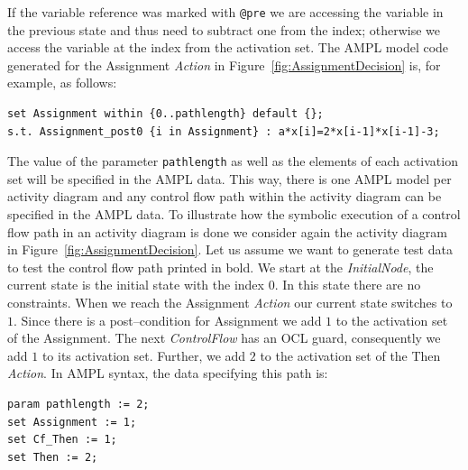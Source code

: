 \documentclass[runningheads,a4paper]{llncs}%
\newcommand{\UMLType}[1]{\textsf{\textit{#1}}} %
\newcommand{\AMPLCode}[1]{\texttt{#1}}
\begin{document}
If the variable reference was marked with \verb=@pre= we are accessing the
variable in the previous state and thus need to subtract one from the index;
otherwise we access the variable at the index from the activation set. The AMPL
model code generated for the Assignment \UMLType{Action} in
Figure~\ref{fig:AssignmentDecision} is, for example, as follows:%
\begin{lstlisting}[basicstyle=\ttfamily,language=ampl,breaklines=true]
set Assignment within {0..pathlength} default {};
s.t. Assignment_post0 {i in Assignment} : a*x[i]=2*x[i-1]*x[i-1]-3;
\end{lstlisting}
The value of the parameter \AMPLCode{pathlength} as well as the elements of each
activation set will be specified in the AMPL data. This way, there is one AMPL
model per activity diagram and any control flow path within the activity
diagram can be specified in the AMPL data. To illustrate how the symbolic
execution of a control flow path in an activity diagram is done we consider
again the activity diagram in Figure~\ref{fig:AssignmentDecision}. Let us assume
we want to generate test data to test the control flow path printed in bold. We
start at the \UMLType{InitialNode}, the current state is the initial state with
the index $0$. In this state there are no constraints. When we reach the
Assignment \UMLType{Action} our current state switches to $1$. Since there is a
post--condition for Assignment we add $1$ to the activation set of the
Assignment. The next \UMLType{ControlFlow} has an OCL guard, consequently we add
$1$ to its activation set. Further, we add $2$ to the activation set of the Then
\UMLType{Action}. In AMPL syntax, the data specifying this path is:%
\begin{lstlisting}[basicstyle=\ttfamily,language=ampl]
param pathlength := 2;
set Assignment := 1;
set Cf_Then := 1;
set Then := 2;
\end{lstlisting}%
\end{document}
